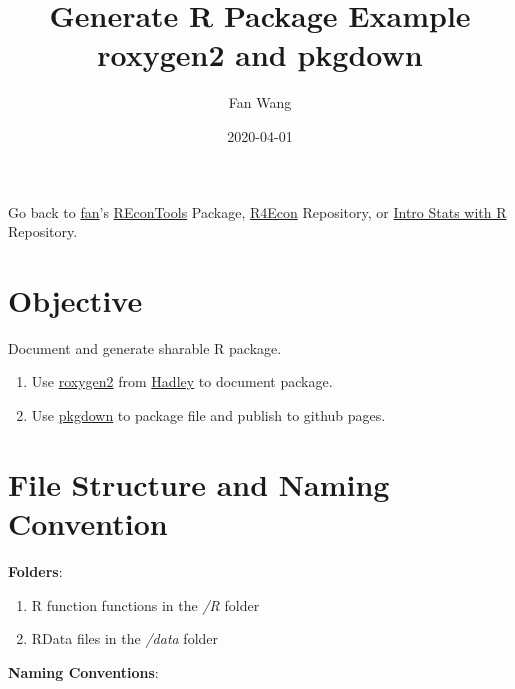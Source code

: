 \documentclass[
]{article}
\title{Generate R Package Example\\
roxygen2 and pkgdown}
\author{Fan Wang}
\date{2020-04-01}
\providecommand{\tightlist}{%
  \setlength{\itemsep}{0pt}\setlength{\parskip}{0pt}}
\begin{document}
\maketitle

Go back to \href{http://fanwangecon.github.io/}{fan}'s
\href{https://fanwangecon.github.io/REconTools/}{REconTools} Package,
\href{https://fanwangecon.github.io/R4Econ/}{R4Econ} Repository, or
\href{https://fanwangecon.github.io/Stat4Econ/}{Intro Stats with R}
Repository.

\hypertarget{objective}{%
\section{Objective}\label{objective}}

Document and generate sharable R package.

\begin{enumerate}
\def\labelenumi{\arabic{enumi}.}
\tightlist
\item
  Use \href{https://github.com/hadley/roxygen2}{roxygen2} from
  \href{https://github.com/hadley}{Hadley} to document package.
\item
  Use \href{https://github.com/r-lib/pkgdown}{pkgdown} to package file
  and publish to github pages.
\end{enumerate}

\hypertarget{file-structure-and-naming-convention}{%
\section{File Structure and Naming
Convention}\label{file-structure-and-naming-convention}}

\textbf{Folders}:

\begin{enumerate}
\def\labelenumi{\arabic{enumi}.}
\tightlist
\item
  R function functions in the \emph{/R} folder
\item
  RData files in the \emph{/data} folder
\end{enumerate}

\textbf{Naming Conventions}:
\end{document}
